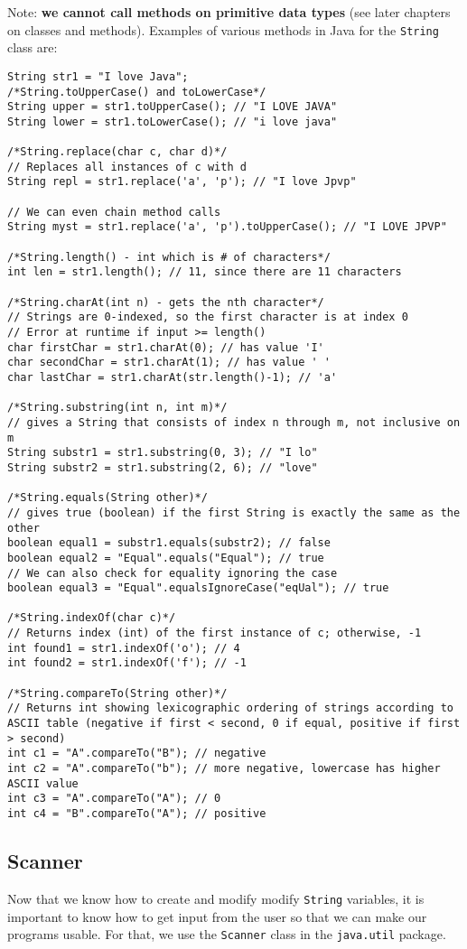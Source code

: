 Note: \textbf{we cannot call methods on primitive data types} (see later chapters on classes and methods). Examples of various methods in Java for the \verb|String| class are:
\begin{lstlisting}
String str1 = "I love Java";
/*String.toUpperCase() and toLowerCase*/
String upper = str1.toUpperCase(); // "I LOVE JAVA"
String lower = str1.toLowerCase(); // "i love java"

/*String.replace(char c, char d)*/
// Replaces all instances of c with d
String repl = str1.replace('a', 'p'); // "I love Jpvp"

// We can even chain method calls
String myst = str1.replace('a', 'p').toUpperCase(); // "I LOVE JPVP"

/*String.length() - int which is # of characters*/
int len = str1.length(); // 11, since there are 11 characters

/*String.charAt(int n) - gets the nth character*/
// Strings are 0-indexed, so the first character is at index 0
// Error at runtime if input >= length()
char firstChar = str1.charAt(0); // has value 'I'
char secondChar = str1.charAt(1); // has value ' '
char lastChar = str1.charAt(str.length()-1); // 'a'

/*String.substring(int n, int m)*/
// gives a String that consists of index n through m, not inclusive on m
String substr1 = str1.substring(0, 3); // "I lo"
String substr2 = str1.substring(2, 6); // "love"

/*String.equals(String other)*/
// gives true (boolean) if the first String is exactly the same as the other
boolean equal1 = substr1.equals(substr2); // false
boolean equal2 = "Equal".equals("Equal"); // true
// We can also check for equality ignoring the case
boolean equal3 = "Equal".equalsIgnoreCase("eqUal"); // true

/*String.indexOf(char c)*/
// Returns index (int) of the first instance of c; otherwise, -1
int found1 = str1.indexOf('o'); // 4
int found2 = str1.indexOf('f'); // -1

/*String.compareTo(String other)*/
// Returns int showing lexicographic ordering of strings according to ASCII table (negative if first < second, 0 if equal, positive if first > second)
int c1 = "A".compareTo("B"); // negative
int c2 = "A".compareTo("b"); // more negative, lowercase has higher ASCII value
int c3 = "A".compareTo("A"); // 0
int c4 = "B".compareTo("A"); // positive
\end{lstlisting}

\subsection{Scanner}
Now that we know how to create and modify modify \verb|String| variables, it is important to know how to get input from the user so that we can make our programs usable. For that, we use the \verb|Scanner| class in the \verb|java.util| package.

